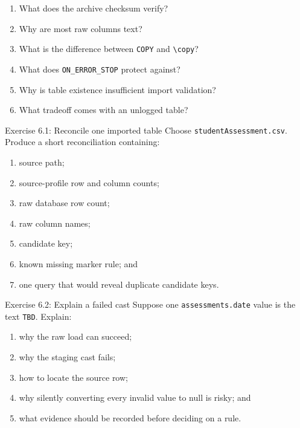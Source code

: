 \begin{enumerate}
  \item What does the archive checksum verify?
  \item Why are most raw columns text?
  \item What is the difference between \texttt{COPY} and
    \texttt{\textbackslash copy}?
  \item What does \texttt{ON\_ERROR\_STOP} protect against?
  \item Why is table existence insufficient import validation?
  \item What tradeoff comes with an unlogged table?
\end{enumerate}

\begin{exercisebox}{Exercise 6.1: Reconcile one imported table}
Choose \texttt{studentAssessment.csv}. Produce a short reconciliation containing:
\begin{enumerate}
  \item source path;
  \item source-profile row and column counts;
  \item raw database row count;
  \item raw column names;
  \item candidate key;
  \item known missing marker rule; and
  \item one query that would reveal duplicate candidate keys.
\end{enumerate}
\end{exercisebox}

\begin{exercisebox}{Exercise 6.2: Explain a failed cast}
Suppose one \texttt{assessments.date} value is the text \texttt{TBD}. Explain:
\begin{enumerate}
  \item why the raw load can succeed;
  \item why the staging cast fails;
  \item how to locate the source row;
  \item why silently converting every invalid value to null is risky; and
  \item what evidence should be recorded before deciding on a rule.
\end{enumerate}
\end{exercisebox}

